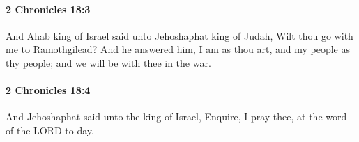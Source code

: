 		\paragraph{2 Chronicles 18:3} %
			\label{2CHRONICLES-18-3}

			And Ahab king of Israel said unto Jehoshaphat king of Judah, Wilt thou go with me to Ramothgilead? And he answered him, I am as thou art, and my people as thy people; and we will be with thee in the war.


		\paragraph{2 Chronicles 18:4} %
			\label{2CHRONICLES-18-4}

			And Jehoshaphat said unto the king of Israel, Enquire, I pray thee, at the word of the LORD to day.


